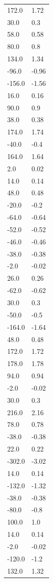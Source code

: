 \begin{longtable}{ll}
172.0 & 1.72 \\
30.0 & 0.3 \\
58.0 & 0.58 \\
80.0 & 0.8 \\
134.0 & 1.34 \\
-96.0 & -0.96 \\
-156.0 & -1.56 \\
16.0 & 0.16 \\
90.0 & 0.9 \\
38.0 & 0.38 \\
174.0 & 1.74 \\
-40.0 & -0.4 \\
164.0 & 1.64 \\
2.0 & 0.02 \\
14.0 & 0.14 \\
48.0 & 0.48 \\
-20.0 & -0.2 \\
-64.0 & -0.64 \\
-52.0 & -0.52 \\
-46.0 & -0.46 \\
-38.0 & -0.38 \\
-2.0 & -0.02 \\
26.0 & 0.26 \\
-62.0 & -0.62 \\
30.0 & 0.3 \\
-50.0 & -0.5 \\
-164.0 & -1.64 \\
48.0 & 0.48 \\
172.0 & 1.72 \\
178.0 & 1.78 \\
94.0 & 0.94 \\
-2.0 & -0.02 \\
30.0 & 0.3 \\
216.0 & 2.16 \\
78.0 & 0.78 \\
-38.0 & -0.38 \\
22.0 & 0.22 \\
-302.0 & -3.02 \\
14.0 & 0.14 \\
-132.0 & -1.32 \\
-38.0 & -0.38 \\
-80.0 & -0.8 \\
100.0 & 1.0 \\
14.0 & 0.14 \\
-2.0 & -0.02 \\
-120.0 & -1.2 \\
132.0 & 1.32 \\

\end{longtable}
